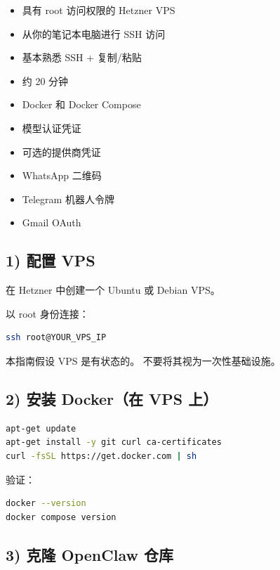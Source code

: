 \begin{itemize}
  \item 具有 root 访问权限的 Hetzner VPS
  \item 从你的笔记本电脑进行 SSH 访问
  \item 基本熟悉 SSH + 复制/粘贴
  \item 约 20 分钟
  \item Docker 和 Docker Compose
  \item 模型认证凭证
  \item 可选的提供商凭证
  \item WhatsApp 二维码
  \item Telegram 机器人令牌
  \item Gmail OAuth
\end{itemize}


\hrulefill


\subsection{1) 配置 VPS}


在 Hetzner 中创建一个 Ubuntu 或 Debian VPS。

以 root 身份连接：

\begin{lstlisting}[language=bash]
ssh root@YOUR_VPS_IP
\end{lstlisting}


本指南假设 VPS 是有状态的。
不要将其视为一次性基础设施。

\hrulefill


\subsection{2) 安装 Docker（在 VPS 上）}


\begin{lstlisting}[language=bash]
apt-get update
apt-get install -y git curl ca-certificates
curl -fsSL https://get.docker.com | sh
\end{lstlisting}


验证：

\begin{lstlisting}[language=bash]
docker --version
docker compose version
\end{lstlisting}


\hrulefill


\subsection{3) 克隆 OpenClaw 仓库}


